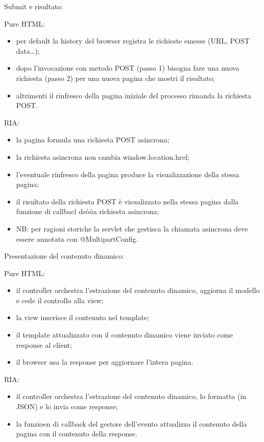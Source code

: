 Submit e risultato:
\begin{multicols}{2}
Pure HTML:
\begin{itemize}
    \item per default la history del browser registra le richieste emesse (URL, POST data\dots);
    \item dopo l'invocazione con metodo POST (passo 1) bisogna fare una nuova richiesta (passo 2) per una nuova pagina che mostri il risultato;
    \item altrimenti il rinfresco della pagina iniziale del processo rimanda la richiesta POST.
\end{itemize}
\vfill\null
\columnbreak
RIA:
\begin{itemize}
    \item la pagina formula una richiesta POST asincrona;
    \item la richiesta asincrona non cambia window.location.href;
    \item l'eventuale rinfresco della pagina produce la visualizzazione della stessa pagina;
    \item il risultato della richiesta POST è visualizzato nella stessa pagina dalla funzione di callbacl deòòa richiesta asincrona;
    \item NB: per ragioni storiche la servlet che gestisca la chiamata asincrona deve essere annotata con @MultipartConfig.
\end{itemize}
\end{multicols}
Presentazione del contenuto dinamico:
\begin{multicols}{2}
Pure HTML:
\begin{itemize}
    \item il controller orchestra l'estrazione del contenuto dinamico, aggiorna il modello e cede il controllo alla view;
    \item la view inserisce il contenuto nel template;
    \item il template attualizzato con il contenuto dinamico viene inviato come response al client;
    \item il browser usa la response per aggiornare l'intera pagina.
\end{itemize}
\vfill\null
\columnbreak
RIA:
\begin{itemize}
    \item il controller orchestra l'estrazione del contenuto dinamico, lo formatta (in JSON) e lo invia come response;
    \item la funzioen di callback del gestore dell'evento attualizza il contenuto della pagina con il contenuto della response.
\end{itemize}
\end{multicols}
